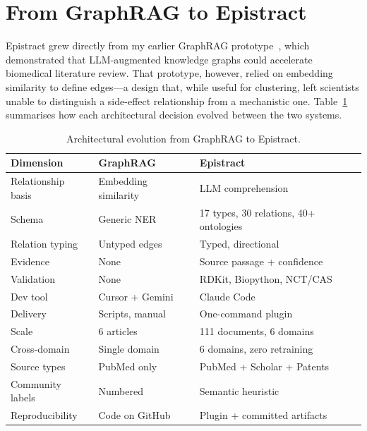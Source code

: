 \section{From GraphRAG to Epistract}
\label{sec:comparison}

Epistract grew directly from my earlier GraphRAG prototype~\cite{bhatt2025latentkg,edge2024graphrag}, which demonstrated that LLM-augmented knowledge graphs could accelerate biomedical literature review. That prototype, however, relied on embedding similarity to define edges---a design that, while useful for clustering, left scientists unable to distinguish a side-effect relationship from a mechanistic one. Table~\ref{tab:evolution} summarises how each architectural decision evolved between the two systems.

\begin{table}[t]
\centering
\caption{Architectural evolution from GraphRAG to Epistract.}
\label{tab:evolution}
\small
\begin{tabular}{@{}lp{2.8cm}p{4.2cm}@{}}
\toprule
\textbf{Dimension} & \textbf{GraphRAG} & \textbf{Epistract} \\
\midrule
Relationship basis   & Embedding similarity        & LLM comprehension \\
Schema               & Generic NER                 & 17 types, 30 relations, 40+ ontologies \\
Relation typing      & Untyped edges               & Typed, directional \\
Evidence             & None                        & Source passage + confidence \\
Validation           & None                        & RDKit, Biopython, NCT/CAS \\
Dev tool             & Cursor + Gemini             & Claude Code \\
Delivery             & Scripts, manual              & One-command plugin \\
Scale                & 6 articles                  & 111 documents, 6 domains \\
Cross-domain         & Single domain               & 6 domains, zero retraining \\
Source types         & PubMed only                 & PubMed + Scholar + Patents \\
Community labels     & Numbered                    & Semantic heuristic \\
Reproducibility      & Code on GitHub              & Plugin + committed artifacts \\
\bottomrule
\end{tabular}
\end{table}

